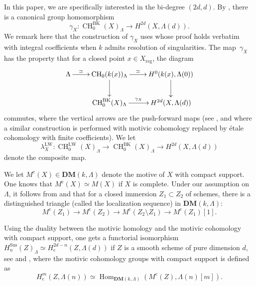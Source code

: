 \documentclass[11pt]{article}
\numberwithin{equation}{section}
\newcommand{\rc}{\mathrm{c}}
\newcommand{\BK}{\mathrm{BK}}
\newcommand{\LW}{\mathrm{LW}}
\newcommand{\sus}{\mathrm{Sus}}
\theoremstyle{definition}
\DeclareMathOperator{\CH}{CH}
\DeclareMathOperator{\Hom}{Hom}
\newcommand{\reg}{\mathrm{reg}}
\begin{document}
In this paper, we are specifically interested in the bi-degree $(2d,d)$. By \cite[Lem.\,7.12]{KP}, there is a canonical group homomorphism
\begin{equation}\label{eqn:MC-sing-0}
\gamma_X \colon \CH_0^{\BK}(X)_{\Lambda} \to H^{2d}(X, \Lambda(d)).
\end{equation}
We remark here that
the construction of $\gamma_X$ uses \cite[Th.\,5.1]{KP} whose proof
holds verbatim
with integral coefficients when $k$ admits resolution of singularities.
The map~$\gamma_X$ has the property that for a closed point $x \in X_{\reg}$,
the diagram
\begin{equation}\label{eqn:MC-sing-1}
\begin{array}{c}
\xymatrix{
\Lambda \ar[r]^-{\simeq} & \CH_0(k(x))_{\Lambda} \ar[r]^-{\simeq} \ar[d] &
H^0(k(x), \Lambda(0)) \ar[d] \\
& \CH_0^{\BK}(X)_{\Lambda} \ar[r]^-{\gamma_X} & H^{2d}(X, \Lambda(d))}
\end{array}
\end{equation}
commutes, where the vertical arrows are the push-forward maps
(see \cite[\S 7]{KP}, and \hbox{\cite[\S 5.1]{BKres}} where a similar construction is performed with motivic cohomology replaced by étale cohomology with finite coefficients).
We let
\[\lambda^{\LW}_X\colon \CH^{\LW}_0(X)_{\Lambda} \to \CH_0^{\BK}(X)_{\Lambda} \to
H^{2d}(X, \Lambda(d))\] denote the composite map.

We let $M^\rc(X) \in \mathbf{DM}(k, \Lambda)$ denote the motive of $X$ with compact support.
One knows that $M^\rc(X) \simeq M(X)$ if $X$ is complete.
Under our assumption on $\Lambda$, it follows from \cite{VoevTriangCat} and
\cite[Chap.\,5]{Kelly} that for a closed immersion $Z_1 \subset Z_2$
of schemes, there is a distinguished triangle (called the localization sequence) in $\mathbf{DM}(k, \Lambda)$:
\begin{equation}\label{eqn:loc-seq}
M^\rc(Z_1) \to M^\rc(Z_2) \to M^\rc(Z_2 \setminus Z_1) \to M^\rc(Z_1)[1].
\end{equation}

Using the duality between the motivic homology and the motivic cohomology
with compact support, one gets a functorial isomorphism
$H^{\sus}_n(Z)_\Lambda \simeq H^{2d-n}_\rc(Z, \Lambda(d))$ if $Z$ is a smooth scheme of pure
dimension $d$, see \cite{FV} and \cite[Chap.\,5]{Kelly}, where the motivic cohomology groups with compact support is defined as
\[ H^m_\rc(Z, \Lambda(n)) \simeq \Hom_{\mathbf{DM}(k, \Lambda)}(M^\rc(Z), \Lambda(n)[m]).
\]
\end{document}
